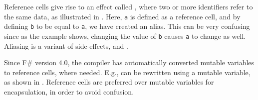 \documentclass[fsharpnotes.tex]{subfiles}
\begin{document}
Reference cells give rise to an effect called , where two or more identifiers refer to the same data, as illustrated in .
%
%
Here, \lstinline!a! is defined as a reference cell, and by defining \lstinline!b! to be equal to \lstinline!a!, we have created an alias. This can be very confusing since as the example shows, changing the value of \lstinline!b! causes \lstinline!a! to change as well. Aliasing is a variant of side-effects, and .

Since F\# version 4.0, the compiler has automatically converted mutable variables to reference cells, where needed.  E.g.,  can be rewritten using a mutable variable, as shown in .
% 
% 
Reference cells are preferred over mutable variables for encapsulation, in order to avoid confusion.
\clearpage
\end{document}
